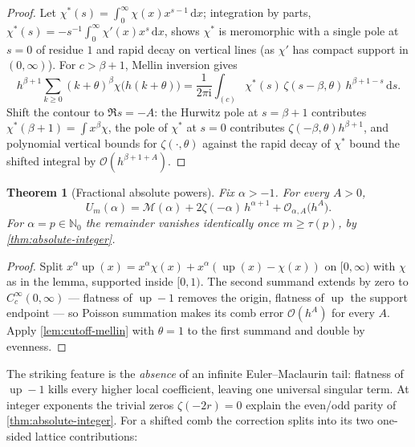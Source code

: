 \documentclass[11pt,oneside]{article}
\numberwithin{equation}{section}
\newtheorem{theorem}{Theorem}[section]
\theoremstyle{definition}
\theoremstyle{remark}
\newcommand{\N}{\mathbb N}
\newcommand{\dd}{\,\mathrm d}
\newcommand{\ii}{\mathrm i}
\newcommand{\Up}{\operatorname{up}}
\newcommand{\bigO}{\mathcal O}
\newcommand{\Mell}{\mathcal M}
\begin{document}
\begin{proof}
Let $\chi^{*}(s)=\int_0^\infty\chi(x)x^{s-1}\dd x$; integration by
parts, $\chi^{*}(s)=-s^{-1}\int_0^\infty\chi'(x)x^{s}\dd x$, shows
$\chi^{*}$ is meromorphic with a single pole at $s=0$ of residue
$1$ and rapid decay on vertical lines (as $\chi'$ has compact support
in $(0,\infty)$).  For $c>\beta+1$, Mellin inversion gives
\[
 h^{\beta+1}\sum_{k\ge0}(k+\theta)^{\beta}
 \chi\bigl(h(k+\theta)\bigr)
 =\frac{1}{2\pi\ii}\int_{(c)}
 \chi^{*}(s)\,\zeta(s-\beta,\theta)\,h^{\beta+1-s}\dd s.
\]
Shift the contour to $\Re s=-A$: the Hurwitz pole at $s=\beta+1$
contributes $\chi^{*}(\beta+1)=\int x^{\beta}\chi$, the pole of
$\chi^{*}$ at $s=0$ contributes $\zeta(-\beta,\theta)h^{\beta+1}$,
and polynomial vertical bounds for $\zeta(\cdot,\theta)$ against the
rapid decay of $\chi^{*}$ bound the shifted integral by
$\bigO(h^{\beta+1+A})$.
\end{proof}

\begin{theorem}[Fractional absolute powers]
\label{thm:fractional-zeta}
Fix $\alpha>-1$.  For every $A>0$,
\begin{equation}
 \boxed{\;
 U_m(\alpha)
 =\Mell(\alpha)
 +2\zeta(-\alpha)\,h^{\alpha+1}
 +\bigO_{\alpha,A}\bigl(h^{A}\bigr).
 \;}
 \label{eq:fractional-zeta}
\end{equation}
For $\alpha=p\in\N_0$ the remainder vanishes identically once
$m\ge\tau(p)$, by \cref{thm:absolute-integer}.
\end{theorem}

\begin{proof}
Split $x^{\alpha}\Up(x)=x^{\alpha}\chi(x)
+x^{\alpha}(\Up(x)-\chi(x))$ on $[0,\infty)$ with $\chi$ as in the
lemma, supported inside $[0,1)$.  The second summand extends by zero
to $C_c^\infty(0,\infty)$ --- flatness of $\Up-1$ removes the origin,
flatness of $\Up$ the support endpoint --- so Poisson summation makes
its comb error $\bigO(h^{A})$ for every $A$.  Apply
\cref{lem:cutoff-mellin} with $\theta=1$ to the first summand and
double by evenness.
\end{proof}

The striking feature is the \emph{absence} of an infinite
Euler--Maclaurin tail: flatness of $\Up-1$ kills every higher local
coefficient, leaving one universal singular term.  At integer
exponents the trivial zeros $\zeta(-2r)=0$ explain the even/odd parity
of \cref{thm:absolute-integer}.  For a shifted comb the correction
splits into its two one-sided lattice contributions:
\end{document}
